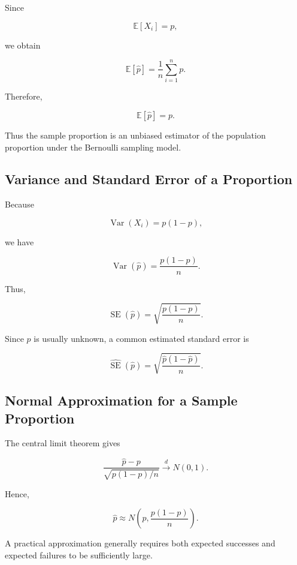 Since

\[
\mathbb{E}[X_i]=p,
\]

we obtain

\[
\mathbb{E}[\widehat{p}]
=
\frac1n
\sum_{i=1}^{n}
p.
\]

Therefore,

\[
\boxed{
\mathbb{E}[\widehat{p}]
=
p.
}
\]

Thus the sample proportion is an unbiased estimator of the population
proportion under the Bernoulli sampling model.

\subsection{Variance and Standard Error of a Proportion}
\label{subsec:variance-se-proportion}

Because

\[
\operatorname{Var}(X_i)
=
p(1-p),
\]

we have

\[
\boxed{
\operatorname{Var}(\widehat{p})
=
\frac{
p(1-p)
}{n}.
}
\]

Thus,

\[
\boxed{
\operatorname{SE}(\widehat{p})
=
\sqrt{
\frac{
p(1-p)
}{n}
}.
}
\]

Since \(p\) is usually unknown, a common estimated standard error is

\[
\boxed{
\widehat{\operatorname{SE}}(\widehat{p})
=
\sqrt{
\frac{
\widehat{p}(1-\widehat{p})
}{n}
}.
}
\]

\subsection{Normal Approximation for a Sample Proportion}
\label{subsec:normal-approx-sample-proportion}

The central limit theorem gives

\[
\boxed{
\frac{
\widehat{p}-p
}{
\sqrt{
p(1-p)/n
}
}
\xrightarrow{d}
N(0,1).
}
\]

Hence,

\[
\boxed{
\widehat{p}
\approx
N
\left(
p,
\frac{
p(1-p)
}{n}
\right).
}
\]

A practical approximation generally requires both expected successes and
expected failures to be sufficiently large.

